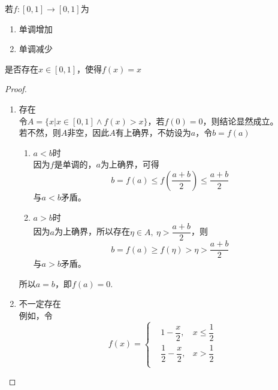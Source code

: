\begin{proposition}

    若$f:[0,1] \to [0,1]$为

    \begin{enumerate}

            \item 单调增加
            
            \item 单调减少

    \end{enumerate}

    是否存在$x \in [0,1]$，使得$f(x) = x$

\end{proposition}

\begin{proof}

    \begin{enumerate}

        \item 
            存在\\
            令$A = \{x | x \in [0,1] \land f(x) > x \} $，若$f(0) = 0$，则结论显然成立。\\
            若不然，则$A$非空，因此$A$有上确界，不妨设为$a$，令$b = f(a)$

            \begin{enumerate}

                \item $a<b$时\\
                    因为$f$是单调的，$a$为上确界，可得
                    $$b = f(a) \leq f\left(\dfrac{a+b}{2}\right) \leq \dfrac{a+b}{2}$$
                    与$a<b$矛盾。

                \item 
                    $a>b$时\\
                    因为$a$为上确界，所以存在$\eta \in A, \ \eta > \dfrac{a+b}{2}$，则
                    $$b = f(a) \geq f(\eta) > \eta > \dfrac{a+b}{2}$$
                    与$a>b$矛盾。

            \end{enumerate}

            所以$a=b$，即$f(a) = 0$.
        
        \item 
            不一定存在\\
            例如，令
            $$f(x) = \left\{
                \begin{aligned}
                    & 1 - \dfrac{x}{2}, &x \leq \dfrac{1}{2} \\
                    & \dfrac{1}{2} - \dfrac{x}{2} , &x > \dfrac{1}{2} \\
                \end{aligned}
                \right.
            $$
            
    \end{enumerate}

\end{proof}

